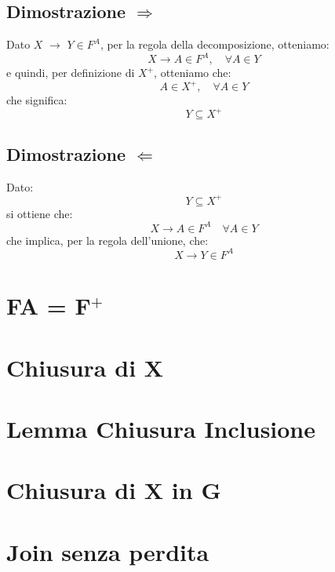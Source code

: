 \documentclass{article}
\begin{document}
\subsection{Dimostrazione $\Rightarrow$}

Dato $X$ $\rightarrow$ $Y \in F^{A}$, per la regola della decomposizione, otteniamo:
\begin{equation}
X \rightarrow A \in F^{A}, \quad \forall A \in Y  
\end{equation} 
e quindi, per definizione di $X^{+}$, otteniamo che: 
\begin{equation}
A \in X^{+}, \quad \forall A \in Y  
\end{equation}
che significa: 
\begin{equation}
Y \subseteq X^{+}
\end{equation}


\subsection{Dimostrazione $\Leftarrow$}
Dato: 
\begin{equation}
Y \subseteq X^{+}
\end{equation}
si ottiene che: 
\begin{equation}
X \rightarrow A \in F^{A} \quad \forall A \in Y
\end{equation}
che implica, per la regola dell'unione, che: 
\begin{equation}
X \rightarrow Y \in F^{A}
\end{equation}

\pagebreak
\section{FA = F$^{+}$}
\pagebreak
\section{Chiusura di X}
\pagebreak
\section{Lemma Chiusura Inclusione}
\pagebreak
\section{Chiusura di X in G}
\pagebreak
\section{Join senza perdita}
\end{document}
